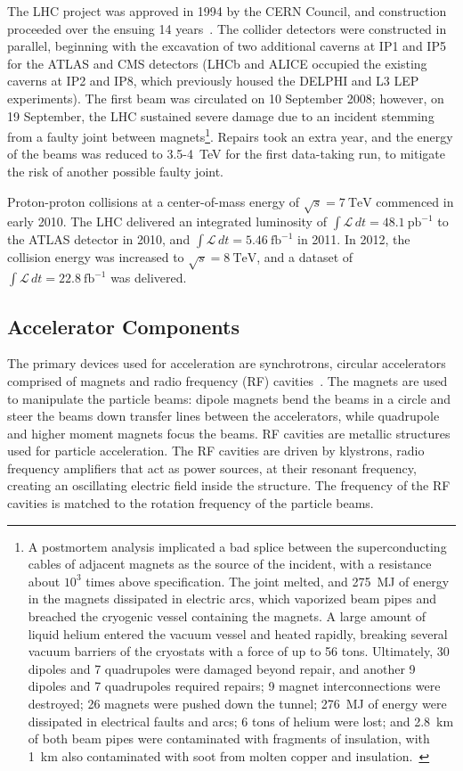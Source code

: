 The LHC project was approved in 1994 by the CERN Council, and construction proceeded over the ensuing 14 years~\cite{Evans:2010va}. The collider detectors were constructed in parallel, beginning with the excavation of two additional caverns at IP1 and IP5 for the ATLAS and CMS detectors (LHCb and ALICE occupied the existing caverns at IP2 and IP8, which previously housed the DELPHI and L3 LEP experiments). The first beam was circulated on 10 September 2008; however, on 19 September, the LHC sustained severe damage due to an incident stemming from a faulty joint between magnets\footnote{A postmortem analysis implicated a bad splice between the superconducting cables of adjacent magnets as the source of the incident, with a resistance about $10^3$ times above specification. The joint melted, and \SI{275}{\mega\joule} of energy in the magnets dissipated in electric arcs, which vaporized beam pipes and breached the cryogenic vessel containing the magnets. A large amount of liquid helium entered the vacuum vessel and heated rapidly, breaking several vacuum barriers of the cryostats with a force of up to 56 tons. Ultimately, 30 dipoles and 7 quadrupoles were damaged beyond repair, and another 9 dipoles and 7 quadrupoles required repairs; 9 magnet interconnections were destroyed; 26 magnets were pushed down the tunnel; \SI{276}{\mega\joule} of energy were dissipated in electrical faults and arcs; 6 tons of helium were lost; and \SI{2.8}{\kilo\meter} of both beam pipes were contaminated with fragments of insulation, with \SI{1}{\kilo\meter} also contaminated with soot from molten copper and insulation.~\cite{Rossi:2010el}}. Repairs took an extra year, and the energy of the beams was reduced to 3.5-\SI{4}{\tera\electronvolt} for the first data-taking run, to mitigate the risk of another possible faulty joint. 

Proton-proton collisions at a center-of-mass energy of $\sqrt{s}=\SI{7}{\tera\electronvolt}$ commenced in early 2010. The LHC delivered an integrated luminosity of $\int \mathcal{L}\, dt=\SI{48.1}{\pico\barn\tothe{-1}}$ to the ATLAS detector in 2010, and $\int \mathcal{L}\, dt=\SI{5.46}{\femto\barn\tothe{-1}}$ in 2011. In 2012, the collision energy was increased to $\sqrt{s}=\SI{8}{\tera\electronvolt}$, and a dataset of $\int \mathcal{L}\, dt=\SI{22.8}{\femto\barn\tothe{-1}}$ was delivered. 

\subsection{Accelerator Components}
The primary devices used for acceleration are synchrotrons, circular accelerators comprised of magnets and radio frequency (RF) cavities~\cite{wiedemann2007particle}. The magnets are used to manipulate the particle beams: dipole magnets bend the beams in a circle and steer the beams down transfer lines between the accelerators, while quadrupole and higher moment magnets focus the beams. RF cavities are metallic structures used for particle acceleration. The RF cavities are driven by klystrons, radio frequency amplifiers that act as power sources, at their resonant frequency, creating an oscillating electric field inside the structure. The frequency of the RF cavities is matched to the rotation frequency of the particle beams.

